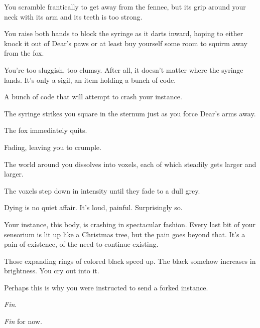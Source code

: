 \null
\vfill

You scramble frantically to get away from the fennec, but its grip around your neck with its arm and its teeth is too strong.

You raise both hands to block the syringe as it darts inward, hoping to either knock it out of Dear's paws or at least buy yourself some room to squirm away from the fox.

You're too sluggish, too clumsy. After all, it doesn't matter where the syringe lands. It's only a sigil, an item holding a bunch of code.

A bunch of code that will attempt to crash your instance.

The syringe strikes you square in the sternum just as you force Dear's arms away.

The fox immediately quits.

Fading, leaving you to crumple.

The world around you dissolves into voxels, each of which steadily gets larger and larger.

The voxels step down in intensity until they fade to a dull grey.

\vfill

\newpage

\null
\vfill

Dying is no quiet affair. It's loud, painful. Surprisingly so.

Your instance, this body, is crashing in spectacular fashion. Every last bit of your sensorium is lit up like a Christmas tree, but the pain goes beyond that. It's a pain of existence, of the need to continue existing.

Those expanding rings of colored black speed up. The black somehow increases in brightness. You cry out into it.

Perhaps this is why you were instructed to send a forked instance.

\vfill

\newpage

\null
\vfill

\emph{Fin}.

\vfill

\newpage

\null
\vfill

\emph{Fin} for now.

\vfill

\newpage

\null
\vfill

